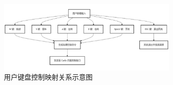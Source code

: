 \begin{figure}[H]
    \centering
    \includegraphics[width=0.8\textwidth]{images/图16 用户键盘控制映射关系示意图.pdf}  %
    \caption{用户键盘控制映射关系示意图}
    \label{fig:example_image}  %
\end{figure}


\begin{tabular}{l l}
\end{tabular}
